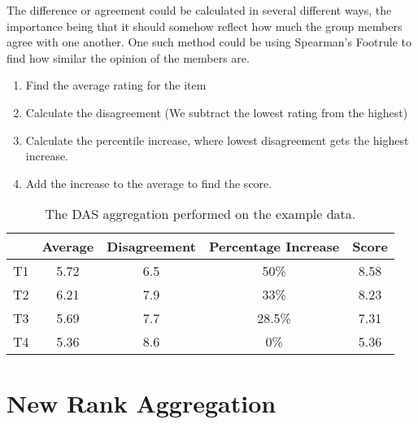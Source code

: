 The difference or agreement could be calculated in several different ways, the importance being that it should somehow reflect how much the group members agree with one another. One such method could be using Spearman's Footrule to find how similar the opinion of the members are.


\begin{enumerate}
	\item Find the average rating for the item
	\item Calculate the disagreement (We subtract the lowest rating from the highest)
	\item Calculate the percentile increase, where lowest disagreement gets the highest increase.
	\item Add the increase to the average to find the score.
\end{enumerate}

\begin{table}[H]
	\centering
	\begin{tabular}{|l|c|c|c|c|}
		\hline
		& \multicolumn{1}{l|}{Average} & \multicolumn{1}{l|}{Disagreement} & \multicolumn{1}{l|}{Percentage Increase} & \multicolumn{1}{l|}{Score} \\ \hline
		T1 & 5.72                         & 6.5                               & 50\%                                     & 8.58                       \\ \hline
		T2 & 6.21                         & 7.9                               & 33\%                                     & 8.23                       \\ \hline
		T3 & 5.69                         & 7.7                               & 28.5\%                                   & 7.31                       \\ \hline
		T4 & 5.36                         & 8.6                               & 0\%                                      & 5.36                       \\ \hline
	\end{tabular}
	\caption{The DAS aggregation performed on the example data.}
	\label{tbl:DASexample}
\end{table}



\section{New Rank Aggregation}

